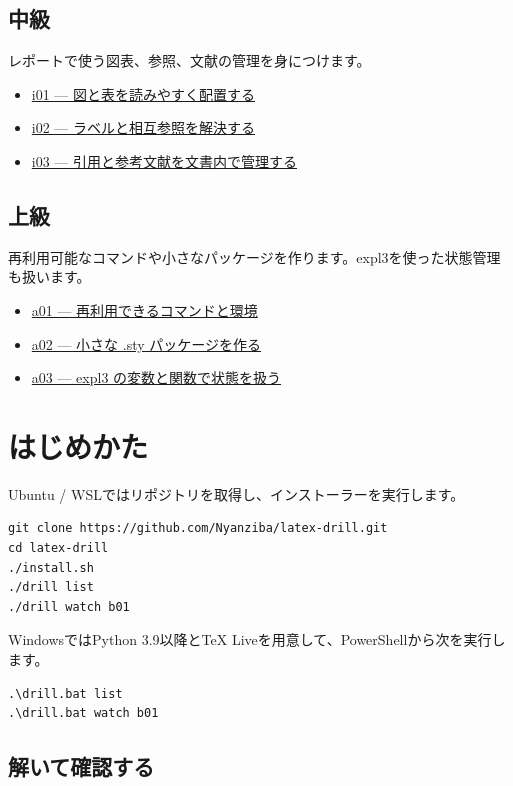 \documentclass[12pt]{article}
\begin{document}
\subsection*{中級}
レポートで使う図表、参照、文献の管理を身につけます。
\begin{itemize}
  \item \href{lessons/intermediate/i01.html}{i01 — 図と表を読みやすく配置する}
  \item \href{lessons/intermediate/i02.html}{i02 — ラベルと相互参照を解決する}
  \item \href{lessons/intermediate/i03.html}{i03 — 引用と参考文献を文書内で管理する}
\end{itemize}

\subsection*{上級}
再利用可能なコマンドや小さなパッケージを作ります。expl3を使った状態管理も扱います。
\begin{itemize}
  \item \href{lessons/advanced/a01.html}{a01 — 再利用できるコマンドと環境}
  \item \href{lessons/advanced/a02.html}{a02 — 小さな .sty パッケージを作る}
  \item \href{lessons/advanced/a03.html}{a03 — expl3 の変数と関数で状態を扱う}
\end{itemize}

\hypertarget{install}{}
\section*{はじめかた}

Ubuntu / WSLではリポジトリを取得し、インストーラーを実行します。

\begin{verbatim}
git clone https://github.com/Nyanziba/latex-drill.git
cd latex-drill
./install.sh
./drill list
./drill watch b01
\end{verbatim}

WindowsではPython 3.9以降とTeX Liveを用意して、PowerShellから次を実行します。

\begin{verbatim}
.\drill.bat list
.\drill.bat watch b01
\end{verbatim}

\subsection*{解いて確認する}
\end{document}
